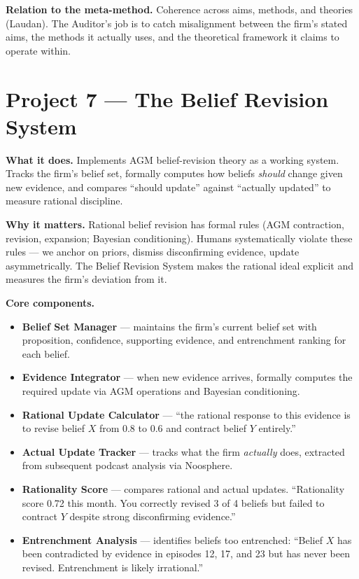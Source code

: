 \documentclass[11pt,letterpaper]{article}
\begin{document}
\textbf{Relation to the meta-method.} Coherence across aims, methods, and theories (Laudan). The Auditor's job is to catch misalignment between the firm's stated aims, the methods it actually uses, and the theoretical framework it claims to operate within.

\section{Project 7 --- The Belief Revision System}

\textbf{What it does.} Implements AGM belief-revision theory as a working system. Tracks the firm's belief set, formally computes how beliefs \emph{should} change given new evidence, and compares ``should update'' against ``actually updated'' to measure rational discipline.

\textbf{Why it matters.} Rational belief revision has formal rules (AGM contraction, revision, expansion; Bayesian conditioning). Humans systematically violate these rules --- we anchor on priors, dismiss disconfirming evidence, update asymmetrically. The Belief Revision System makes the rational ideal explicit and measures the firm's deviation from it.

\textbf{Core components.}

\begin{itemize}[leftmargin=1.5em,itemsep=0.1em]
\item \textbf{Belief Set Manager} --- maintains the firm's current belief set with proposition, confidence, supporting evidence, and entrenchment ranking for each belief.
\item \textbf{Evidence Integrator} --- when new evidence arrives, formally computes the required update via AGM operations and Bayesian conditioning.
\item \textbf{Rational Update Calculator} --- ``the rational response to this evidence is to revise belief $X$ from 0.8 to 0.6 and contract belief $Y$ entirely.''
\item \textbf{Actual Update Tracker} --- tracks what the firm \emph{actually} does, extracted from subsequent podcast analysis via Noosphere.
\item \textbf{Rationality Score} --- compares rational and actual updates. ``Rationality score 0.72 this month. You correctly revised 3 of 4 beliefs but failed to contract $Y$ despite strong disconfirming evidence.''
\item \textbf{Entrenchment Analysis} --- identifies beliefs too entrenched: ``Belief $X$ has been contradicted by evidence in episodes 12, 17, and 23 but has never been revised. Entrenchment is likely irrational.''
\end{itemize}
\end{document}
